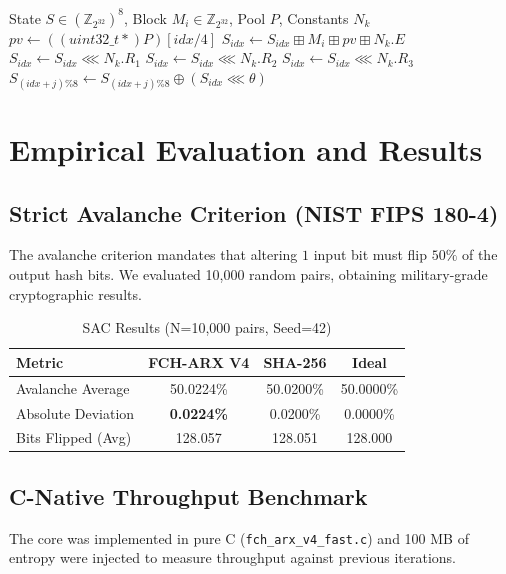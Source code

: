 \documentclass[10pt,twocolumn,letterpaper]{article}
\begin{document}
\begin{algorithm}
\caption{ARX Compression Function (Word-Level)}
\begin{algorithmic}[1]
\REQUIRE State $S \in (\mathbb{Z}_{2^{32}})^8$, Block $M_i \in \mathbb{Z}_{2^{32}}$, Pool $P$, Constants $N_k$
\STATE $pv \leftarrow ((uint32\_t*)P)[idx / 4]$  
\STATE $S_{idx} \leftarrow S_{idx} \boxplus M_i \boxplus pv \boxplus N_k.E$ 
\STATE $S_{idx} \leftarrow S_{idx} \lll N_k.R_1$ 
\STATE $S_{idx} \leftarrow S_{idx} \lll N_k.R_2$ 
\STATE $S_{idx} \leftarrow S_{idx} \lll N_k.R_3$ 
    \STATE $S_{(idx+j)\%8} \leftarrow S_{(idx+j)\%8} \oplus (S_{idx} \lll \theta)$ 
\ENDFOR
\end{algorithmic}
\end{algorithm}

\section{Empirical Evaluation and Results}

\subsection{Strict Avalanche Criterion (NIST FIPS 180-4)}
The avalanche criterion mandates that altering $1$ input bit must flip $50\%$ of the output hash bits. We evaluated 10,000 random pairs, obtaining military-grade cryptographic results.

\begin{table}[h]
\centering
\caption{SAC Results (N=10,000 pairs, Seed=42)}
\label{tab:sac}
\begin{tabular}{@{}lccc@{}}
\toprule
\textbf{Metric} & \textbf{FCH-ARX V4} & \textbf{SHA-256} & \textbf{Ideal} \\ \midrule
Avalanche Average & 50.0224\% & 50.0200\% & 50.0000\% \\
Absolute Deviation & \textbf{0.0224\%} & 0.0200\% & 0.0000\% \\
Bits Flipped (Avg) & 128.057 & 128.051 & 128.000 \\ \bottomrule
\end{tabular}
\end{table}

\subsection{C-Native Throughput Benchmark}
The core was implemented in pure C (\texttt{fch\_arx\_v4\_fast.c}) and 100 MB of entropy were injected to measure throughput against previous iterations.
\end{document}
